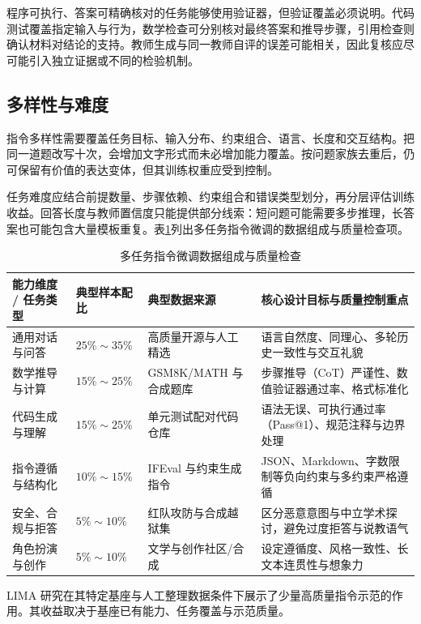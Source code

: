 \documentclass[../textbook.tex]{subfiles}
\begin{document}
程序可执行、答案可精确核对的任务能够使用验证器，但验证覆盖必须说明。代码测试覆盖指定输入与行为，数学检查可分别核对最终答案和推导步骤，引用检查则确认材料对结论的支持。教师生成与同一教师自评的误差可能相关，因此复核应尽可能引入独立证据或不同的检验机制。

\subsection{多样性与难度}
指令多样性需要覆盖任务目标、输入分布、约束组合、语言、长度和交互结构。把同一道题改写十次，会增加文字形式而未必增加能力覆盖。按问题家族去重后，仍可保留有价值的表达变体，但其训练权重应受到控制。

任务难度应结合前提数量、步骤依赖、约束组合和错误类型划分，再分层评估训练收益。回答长度与教师置信度只能提供部分线索：短问题可能需要多步推理，长答案也可能包含大量模板重复。表\ref{tab:sft-data-mixture}列出多任务指令微调的数据组成与质量检查项。

\begin{table}[htbp]
\centering
\caption{多任务指令微调数据组成与质量检查}
\label{tab:sft-data-mixture}
\begin{tabularx}{\linewidth}{lp{22mm}p{25mm}X}
\toprule
能力维度 / 任务类型 & 典型样本配比 & 典型数据来源 & 核心设计目标与质量控制重点 \\
\midrule
通用对话与问答 & $25\%\sim 35\%$ & 高质量开源与人工精选 & 语言自然度、同理心、多轮历史一致性与交互礼貌 \\
数学推导与计算 & $15\%\sim 25\%$ & GSM8K/MATH 与合成题库 & 步骤推导（CoT）严谨性、数值验证器通过率、格式标准化 \\
代码生成与理解 & $15\%\sim 25\%$ & 单元测试配对代码仓库 & 语法无误、可执行通过率（Pass@1）、规范注释与边界处理 \\
指令遵循与结构化 & $10\%\sim 15\%$ & IFEval 与约束生成指令 & JSON、Markdown、字数限制等负向约束与多约束严格遵循 \\
安全、合规与拒答 & $5\%\sim 10\%$ & 红队攻防与合成越狱集 & 区分恶意意图与中立学术探讨，避免过度拒答与说教语气 \\
角色扮演与创作 & $5\%\sim 10\%$ & 文学与创作社区/合成 & 设定遵循度、风格一致性、长文本连贯性与想象力 \\
\bottomrule
\end{tabularx}
\end{table}

LIMA 研究在其特定基座与人工整理数据条件下展示了少量高质量指令示范的作用\cite{zhou2023lima}。其收益取决于基座已有能力、任务覆盖与示范质量。
\end{document}
